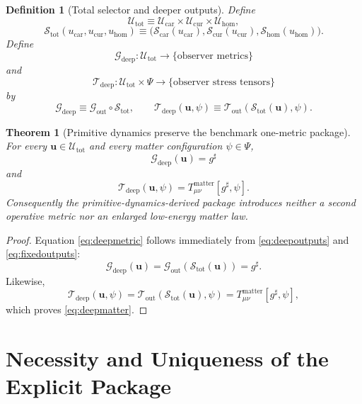 \documentclass[11pt]{article}
\newcommand{\CompletedMetric}{g^{\sharp}}
\newcommand{\Car}{\mathrm{car}}
\newcommand{\Cur}{\mathrm{cur}}
\newcommand{\Hom}{\mathrm{hom}}
\newcommand{\MetricOut}{\mathscr G_{\mathrm{out}}}
\newcommand{\MatterOut}{\mathscr T_{\mathrm{out}}}
\newcommand{\DeepMetricOut}{\mathscr G_{\mathrm{deep}}}
\newcommand{\DeepMatterOut}{\mathscr T_{\mathrm{deep}}}
\newcommand{\DeepSpace}[1]{\mathcal U_{#1}}
\newcommand{\ChainSelect}[1]{\mathcal S_{#1}}
\newcommand{\DeepShell}{\mathcal U_{\mathrm{tot}}}
\newcommand{\ChainSelectTriple}{\mathcal S_{\mathrm{tot}}}
\newtheorem{definition}{Definition}
\newtheorem{theorem}{Theorem}
\begin{document}
\begin{definition}[Total selector and deeper outputs]
\label{def:deepoutputs}
Define
\[
\DeepShell
\equiv
\DeepSpace{\Car}\times\DeepSpace{\Cur}\times\DeepSpace{\Hom},
\]
\[
\ChainSelectTriple(u_{\Car},u_{\Cur},u_{\Hom})
\equiv
\bigl(
\ChainSelect{\Car}(u_{\Car}),
\ChainSelect{\Cur}(u_{\Cur}),
\ChainSelect{\Hom}(u_{\Hom})
\bigr).
\]
Define
\[
\DeepMetricOut:\DeepShell\to\{\text{observer metrics}\}
\]
and
\[
\DeepMatterOut:\DeepShell\times\Psi\to\{\text{observer stress tensors}\}
\]
by
\begin{equation}
\DeepMetricOut
\equiv
\MetricOut\circ\ChainSelectTriple,
\qquad
\DeepMatterOut(\mathbf u,\psi)
\equiv
\MatterOut(\ChainSelectTriple(\mathbf u),\psi).
\label{eq:deepoutputs}
\end{equation}
\end{definition}

\begin{theorem}[Primitive dynamics preserve the benchmark one-metric package]
\label{thm:outputs}
For every \(\mathbf u\in\DeepShell\) and every matter configuration \(\psi\in\Psi\),
\begin{equation}
\DeepMetricOut(\mathbf u)=\CompletedMetric
\label{eq:deepmetric}
\end{equation}
and
\begin{equation}
\DeepMatterOut(\mathbf u,\psi)
=
T_{\mu\nu}^{\mathrm{matter}}[\CompletedMetric,\psi].
\label{eq:deepmatter}
\end{equation}
Consequently the primitive-dynamics-derived package introduces neither a second operative metric nor an enlarged low-energy matter law.
\end{theorem}

\begin{proof}
Equation \eqref{eq:deepmetric} follows immediately from \eqref{eq:deepoutputs} and \eqref{eq:fixedoutputs}:
\[
\DeepMetricOut(\mathbf u)
=
\MetricOut(\ChainSelectTriple(\mathbf u))
=
\CompletedMetric.
\]
Likewise,
\[
\DeepMatterOut(\mathbf u,\psi)
=
\MatterOut(\ChainSelectTriple(\mathbf u),\psi)
=
T_{\mu\nu}^{\mathrm{matter}}[\CompletedMetric,\psi],
\]
which proves \eqref{eq:deepmatter}.
\end{proof}

\section{Necessity and Uniqueness of the Explicit Package}
\end{document}
